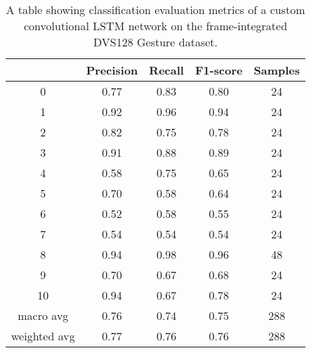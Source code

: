 \begin{table}[htb]
    \centering
    \begin{tabular}{|| c | c | c | c | c ||}
        \hline
             & Precision & Recall & F1-score & Samples \\
        \hline
        \hline
        0            & 0.77 & 0.83 & 0.80 & 24  \\
        \hline
        1            & 0.92 & 0.96 & 0.94 & 24  \\
        \hline
        2            & 0.82 & 0.75 & 0.78 & 24  \\
        \hline
        3            & 0.91 & 0.88 & 0.89 & 24  \\
        \hline
        4            & 0.58 & 0.75 & 0.65 & 24  \\
        \hline
        5            & 0.70 & 0.58 & 0.64 & 24  \\
        \hline
        6            & 0.52 & 0.58 & 0.55 & 24  \\
        \hline
        7            & 0.54 & 0.54 & 0.54 & 24  \\
        \hline
        8            & 0.94 & 0.98 & 0.96 & 48  \\
        \hline
        9            & 0.70 & 0.67 & 0.68 & 24  \\
        \hline
        10           & 0.94 & 0.67 & 0.78 & 24  \\
        \hline
        macro avg    & 0.76 & 0.74 & 0.75 & 288 \\
        \hline
        weighted avg & 0.77 & 0.76 & 0.76 & 288 \\
        \hline
    \end{tabular}
    \caption{A table showing classification evaluation metrics of a custom convolutional LSTM network on the frame-integrated DVS128 Gesture dataset.}
    \label{tab:custom_conv_lstm_dvs128_evaluation_metrics}
\end{table}

